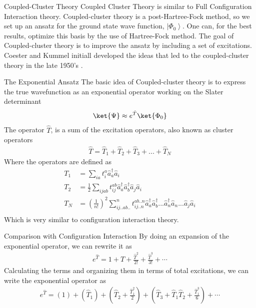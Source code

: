 \documentclass[twoside,english]{uiofysmaster}
\begin{document}
\begin{chapter}{Coupled-Cluster Theory} 
	Coupled Cluster Theory is similar to Full Configuration Interaction theory. Coupled-cluster theory is a post-Hartree-Fock method, so we set up an ansatz for the ground state wave function, $\left| \Phi_0 \right>$. One can, for the best results, optimize this basis by the use of Hartree-Fock method. The goal of Coupled-cluster theory is to improve the ansatz by including a set of excitations. Coester and Kummel initiall developed the ideas that led to the coupled-cluster theory in the late 1950's \cite{MHJonline}. 
 	
 	\begin{section}{The Exponential Ansatz}
 		The basic idea of Coupled-cluster theory is to express the true wavefunction as an exponential operator working on the Slater determinant \cite{ShavittAndBartlett,MHJonline,Crawford}
 		\begin{align}
	 		\ket{\Psi} \approx e^{\hat T} \ket{\Phi_0}
	  	\end{align}
	  	The operator $\hat T$, is a sum of the excitation operators, also known as cluster operators
	  	\begin{align}
	  		\hat T = \hat T_1 + \hat T_2 + \hat T_3 + ... + \hat T_N
	  	\end{align}
	  	Where the operators are defined as
	  	\begin{align}
	  		T_1 &= \sum_{ia} t_i^a \hat a_a^{\dagger} \hat a_i \\
	  		T_2 &= \frac{1}{2} \sum_{ijab} t_{ij}^{ab} \hat a_a^{\dagger}\hat a_b^{\dagger} \hat a_j \hat a_i \\
	  		T_N &= \left(\frac{1}{n!}\right)^2 \sum_{ij..ab..}^n t_{ij..n}^{ab..n} \hat a_a^{\dagger}\hat a_b^{\dagger} ...\hat a_n^{\dagger} \hat a_n ... \hat a_j \hat a_i \\
	  	\end{align}
	  	Which is very similar to configuration interaction theory.
	\end{section}

	\begin{section}{Comparison with Configuration Interaction}
	  	By doing an expansion of the exponential operator, we can rewrite it as
	  	\begin{align}
	  		e^{\hat T} = 1 + \hat T + \frac{\hat T^2}{2!} + \frac{\hat T^3}{3!} + \cdots
	  	\end{align}
	  	Calculating the terms and organizing them in terms of total excitations, we can write the exponential operator as 
	  	\begin{align}
	  		e^{\hat T} = \left( 1 \right)  + \left( \hat T_1 \right) + \left( \hat T_2 + \frac{\hat T_1^2}{2} \right) + \left( \hat T_3 + \hat T_1 \hat T_2 + \frac{\hat T_1^3}{6} \right) + \cdots 
	  	\end{align}	
	  	

\end{section}
\end{chapter}
\end{document}
